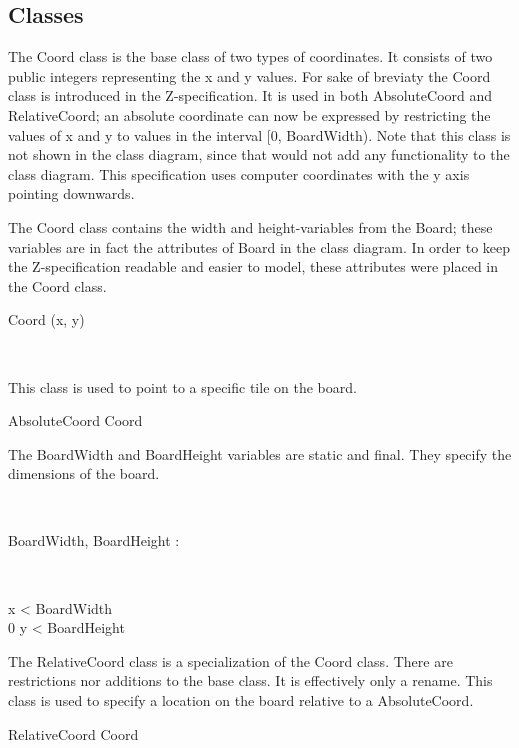 \subsection{Classes}

The Coord class is the base class of two types of coordinates. It consists of two public integers representing the x and y values.
For sake of breviaty the Coord class is introduced in the Z-specification. It is used in both AbsoluteCoord and RelativeCoord; an absolute coordinate can now be expressed by restricting the values of x and y to values in the interval [0, BoardWidth). Note that this class is not shown in the class diagram, since that would not add any functionality to the class diagram. This specification uses computer coordinates with the y axis pointing downwards.

The Coord class contains the width and height-variables from the Board; these variables are in fact the attributes of Board in the class diagram. In order to keep the Z-specification readable and easier to model, these attributes were placed in the Coord class.
\begin{class}{Coord}
\upharpoonright (x, y) \\
 \\
\end{class}

This class is used to point to a specific tile on the board.
\begin{class}{AbsoluteCoord}
Coord \\
\begin{zpar}
The BoardWidth and BoardHeight variables are static and final. They specify the dimensions of the board.
\end{zpar} \\
\begin{axdef}
BoardWidth, BoardHeight : \nat
\end{axdef} \\
\begin{state}
 \leq x < BoardWidth \\
0 \leq y < BoardHeight
\end{state}
\end{class}

The RelativeCoord class is a specialization of the Coord class. There are restrictions nor additions to the base class. It is effectively only a rename. This class is used to specify a location on the board relative to a AbsoluteCoord.
\begin{class}{RelativeCoord}
Coord \\
\end{class}

